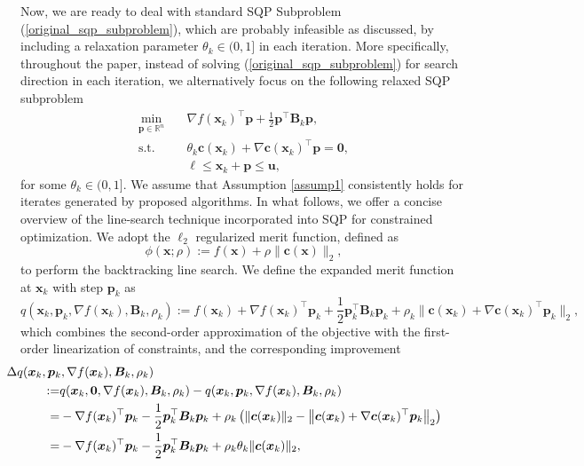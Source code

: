 \documentclass[aos]{imsart}
\numberwithin{equation}{section}
\theoremstyle{plain}
\begin{document}
Now, we are ready to deal with standard SQP Subproblem (\ref{original_sqp_subproblem}), which are probably infeasible as discussed, by including a relaxation parameter $\theta_k \in (0,1]$ in each iteration.
More specifically, throughout the paper, instead of solving (\ref{original_sqp_subproblem}) for search direction in each iteration, we alternatively focus on the following relaxed SQP subproblem
\begin{equation}
\label{relaxed_sqp_subproblem}
    \begin{split}
        \min_{\bm{p} \in \mathbb{R}^{n}} & \hspace{1em} \nabla f(\bm{x}_k)^{\top}\bm{p}+ \frac{1}{2}\bm{p}^{\top}\bm{B}_k\bm{p},\\
        \text{s.t.} & \hspace{1em} \theta_k \bm{c}(\bm{x}_k)+\nabla \bm{c}(\bm{x}_k)^{\top}\bm{p} = \bm{0},\\
        & \hspace{1em} \bm{\ell} \leq \bm{x}_k + \bm{p} \leq \bm{u},
    \end{split}    
\end{equation} 
for some $\theta_k \in (0,1]$.
We assume that Assumption \ref{assump1} consistently holds for iterates generated by proposed algorithms.
In what follows, we offer a concise overview of the line-search technique incorporated into SQP for constrained optimization.
We adopt the $\ell_2$ regularized merit function, defined as
\begin{equation}
    \phi(\bm{x};\rho):= f(\bm{x}) + \rho \|\bm{c}(\bm{x})\|_2,
\end{equation}
to perform the backtracking line search. We define the expanded merit function at $\bm{x}_k$ with step $\bm{p}_k$ as 
\begin{equation}
    q(\bm{x}_k,\bm{p}_k,\nabla f(\bm{x}_k),\bm{B}_k,\rho_k) := f(\bm{x}_{k}) + \nabla f(\bm{x}_k)^{\top} \bm{p}_k + \frac{1}{2} \bm{p}_k^{\top} \bm{B}_k \bm{p}_k + \rho_k \|\bm{c}(\bm{x}_k) + \nabla \bm{c}(\bm{x}_k)^{\top}\bm{p}_k\|_2,
\end{equation}
which combines the second-order approximation of the objective with the first-order linearization of constraints, and the corresponding improvement 
\begin{equation}
\begin{split}
    & 
    \hspace{-15mm}
    \Delta q(\bm{x}_k,\bm{p}_k,\nabla f(\bm{x}_k), \bm{B}_k,\rho_k)\\
    := & q(\bm{x}_k,\bm{0},\nabla f(\bm{x}_k),\bm{B}_k,\rho_k) - q(\bm{x}_k,\bm{p}_k,\nabla f(\bm{x}_k),\bm{B}_k,\rho_k)\\
    = & -\nabla f(\bm{x}_k)^{\top} \bm{p}_k - \frac{1}{2} \bm{p}_k^{\top} \bm{B}_k \bm{p}_k + \rho_k \left(\|\bm{c}(\bm{x}_k)\|_2 - \left\|\bm{c}(\bm{x}_k) + \nabla \bm{c}(\bm{x}_k)^{\top}\bm{p}_k\right\|_2 \right)\\
    = & -\nabla f(\bm{x}_k)^{\top} \bm{p}_k - \frac{1}{2} \bm{p}_k^{\top} \bm{B}_k \bm{p}_k + \rho_k \theta_k \|\bm{c}(\bm{x}_k)\|_2,
\end{split}
\end{equation}
\end{document}
